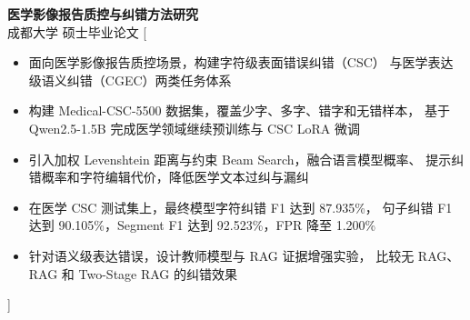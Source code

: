 \documentclass[zh]{resume}
\begin{document}
\begin{experiences}
    {\textbf{医学影像报告质控与纠错方法研究}\\
     成都大学 \textbullet 硕士毕业论文}%
    [\begin{itemize}
      \item 面向医学影像报告质控场景，构建字符级表面错误纠错（CSC）
        与医学表达级语义纠错（CGEC）两类任务体系
      \item 构建 Medical-CSC-5500 数据集，覆盖少字、多字、错字和无错样本，
        基于 Qwen2.5-1.5B 完成医学领域继续预训练与 CSC LoRA 微调
      \item 引入加权 Levenshtein 距离与约束 Beam Search，融合语言模型概率、
        提示纠错概率和字符编辑代价，降低医学文本过纠与漏纠
      \item 在医学 CSC 测试集上，最终模型字符纠错 F1 达到 87.935\%，
        句子纠错 F1 达到 90.105\%，Segment F1 达到 92.523\%，FPR 降至 1.200\%
      \item 针对语义级表达错误，设计教师模型与 RAG 证据增强实验，
        比较无 RAG、RAG 和 Two-Stage RAG 的纠错效果
    \end{itemize}]
\end{experiences}
\end{document}
